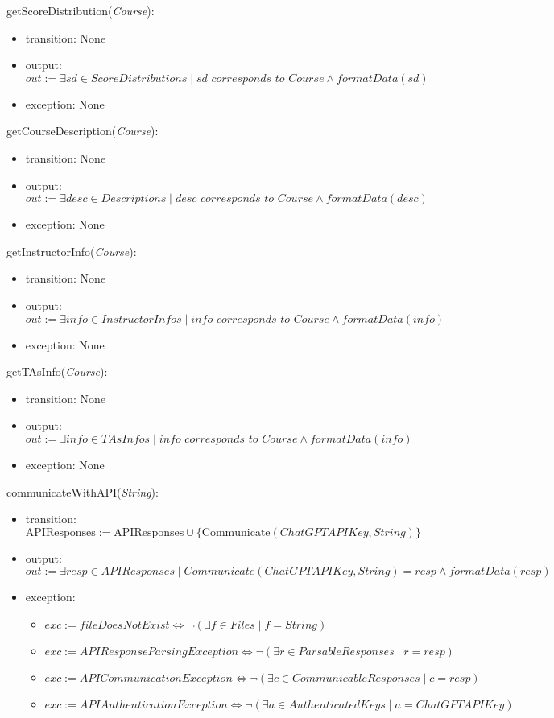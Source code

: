 \documentclass[12pt, titlepage]{article}
\begin{document}
\noindent getScoreDistribution(\textit{Course}):
\begin{itemize}
\item transition: None
\item output: $out := \mathit{\exists sd \in ScoreDistributions \mid sd \text{ corresponds to } Course \land formatData(sd)}$
\item exception: None
\end{itemize}

\noindent getCourseDescription(\textit{Course}):
\begin{itemize}
\item transition: None
\item output: $out := \mathit{\exists desc \in Descriptions \mid desc \text{ corresponds to } Course \land formatData(desc)}$
\item exception: None
\end{itemize}

\noindent getInstructorInfo(\textit{Course}):
\begin{itemize}
\item transition: None
\item output: $out := \mathit{\exists info \in InstructorInfos \mid info \text{ corresponds to } Course \land formatData(info)}$
\item exception: None
\end{itemize}

\noindent getTAsInfo(\textit{Course}):
\begin{itemize}
\item transition: None
\item output: $out := \mathit{\exists info \in TAsInfos \mid info \text{ corresponds to } Course \land formatData(info)}$
\item exception: None
\end{itemize}

\noindent communicateWithAPI(\textit{String}):
\begin{itemize}
\item transition: \( \text{APIResponses} := \text{APIResponses} \cup \{ \text{Communicate}(ChatGPTAPIKey, String) \} \)
\item output: $out := \mathit{\exists resp \in APIResponses \mid Communicate(ChatGPTAPIKey, String) = resp \land formatData(resp)}$
\item exception: 
    \begin{itemize}
        \item $exc := \mathit{fileDoesNotExist} \iff \lnot (\exists f \in Files \mid f = String)$
        \item $exc := \mathit{APIResponseParsingException} \iff \lnot (\exists r \in ParsableResponses \mid r = resp)$
        \item $exc := \mathit{APICommunicationException} \iff \lnot (\exists c \in CommunicableResponses \mid c = resp)$
        \item $exc := \mathit{APIAuthenticationException} \iff \lnot (\exists a \in AuthenticatedKeys \mid a = ChatGPTAPIKey)$
    \end{itemize}
\end{itemize}
\end{document}

